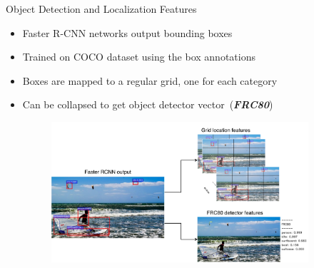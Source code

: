 \documentclass{beamer}
\begin{document}
\begin{frame}{Object Detection and Localization Features}
    \begin{itemize}
        \item Faster R-CNN networks output bounding boxes 
        \item Trained on COCO dataset using the box annotations 
        \item Boxes are mapped to a regular grid, one for each category 
        \item Can be collapsed to get object detector vector~(\textbf{\emph{FRC80}}) 
        \begin{figure}[h]
          \includegraphics[width=0.9\textwidth]{images/FrcnnFeats.pdf}
        \end{figure}
    \end{itemize}
\end{frame}
\end{document}
